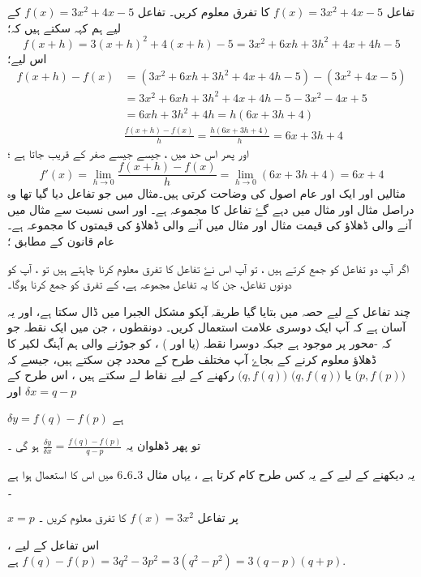 تفاعل \(f(x)=3x^2+4x-5\) کا تفرق معلوم کریں۔
تفاعل \(f(x)=3x^2+4x-5\) کے لیے ہم کہہ سکتے ہیں کہ؛\[f(x+h)=3(x+h)^2+4(x+h)-5=3x^2+6xh+3h^2+4x+4h-5\]
اس لیے؛ 
\begin{align}
f(x+h)-f(x)&=(3x^2+6xh+3h^2+4x+4h-5)-(3x^2+4x-5)\\
&=3x^2+6xh+3h^2+4x+4h-5-3x^2-4x+5\\
&=6xh+3h^2+4h=h(6x+3h+4)\\
&\frac{f(x+h)-f(x)}{h}=\frac{h(6x+3h+4)}{h}=6x+3h+4
\end{align}
 اور پھر اس حد میں ، جیسے جیسے   صفر کے قریب جاتا ہے ؛ 
\[f'(x)=\lim_{h \to 0}\frac{f(x+h)-f(x)}{h}=\lim_{h \to 0} (6x+3h+4)=6x+4 \]
مثالیں    اور    ایک اور عام اصول کی وضاحت کرتی ہیں۔مثال    میں جو تفاعل دیا گیا تھا وہ دراصل مثال    اور مثال     میں دہے گۓ تفاعل کا مجموعہ ہے۔ اور اسی نسبت سے   مثال    میں آنے والی ڈھلاؤ کی قیمت مثال   اور مثال    میں آنے والی ڈھلاؤ کی قیمتوں کا مجموعہ ہے۔
 عام قانون کے مطابق ؛
 
اگر آپ دو تفاعل کو جمع کرتے ہیں ، تو آپ اس نۓ تفاعل کا تفرق معلوم کرنا چاہتے ہیں تو ، آپ کو دونوں تفاعل، جن کا یہ تفاعل مجموعہ ہے، کے تفرق کو جمع کرنا ہوگا۔

چند تفاعل کے لیے حصہ   میں بتایا گیا طریقہ آپکو مشکل الجبرا میں ڈال سکتا ہے، اور یہ آسان ہے کہ آپ ایک دوسری علامت استعمال کریں۔  دونقطوں ، جن میں ایک نقطہ  جو کہ  -محور پر موجود ہے جبکہ دوسرا نقطہ    (یا     اور    ) ، کو جوڑنے والی ہم آہنگ لکیر کا ڈھلاؤ معلوم کرنے کے بجاۓ آپ مختلف طرح کے محدد چن سکتے ہیں، جیسے کہ  \(\big( p,f(p) \big)\) یا \(\big( q,f(q) \big)\)
\(\big( q,f(q) \big)\) رکھنے کے لیے نقاط لے سکتے ہیں ،  اس طرح کے \(\delta x=q-p\) اور 

\(\delta y =f(q)-f(p)\) ہے   

تو پھر ڈھلوان یہ \(\frac{\delta y}{\delta x}=\frac{f(q)-f(p)}{q-p}\) ہو گی ۔ 

یہ دیکھنے کے لیے کے یہ کس طرح کام کرتا ہے ، یہاں مثال 3۔6۔6 میں   اس کا استعمال ہوا ہے ۔ 


\(x=p\) پر تفاعل \(f(x)=3x^2\) کا تفرق معلوم کریں ۔ 

اس تفاعل کے لیے ، \(f(q)-f(p)=3q^2-3p^2=3(q^2-p^2)=3(q-p)(q+p)\) ہے.


